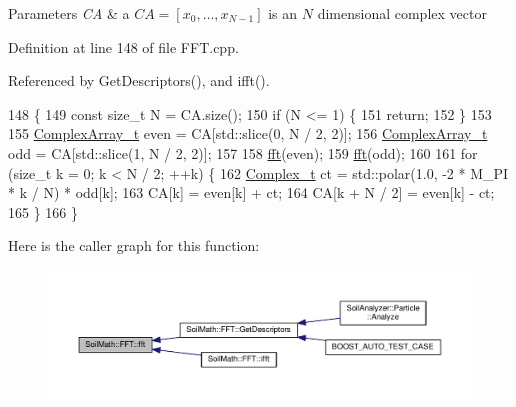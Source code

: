 \begin{DoxyParams}{Parameters}
{\em C\+A} & a $ CA=[x_0,\ldots,x_{N-1}] $ is an $ N $ dimensional complex vector \\
\hline
\end{DoxyParams}


Definition at line 148 of file F\+F\+T.\+cpp.



Referenced by Get\+Descriptors(), and ifft().


\begin{DoxyCode}
148                                 \{
149   \textcolor{keyword}{const} \textcolor{keywordtype}{size\_t} N = CA.size();
150   \textcolor{keywordflow}{if} (N <= 1) \{
151     \textcolor{keywordflow}{return};
152   \}
153 
155   \hyperlink{_soil_math_types_8h_a5118c9f6b02a06945c93a3893e51febe}{ComplexArray\_t} even = CA[std::slice(0, N / 2, 2)];
156   \hyperlink{_soil_math_types_8h_a5118c9f6b02a06945c93a3893e51febe}{ComplexArray\_t} odd = CA[std::slice(1, N / 2, 2)];
157 
158   \hyperlink{class_soil_math_1_1_f_f_t_a48bc7ad948d820d6f87b3e353b6d1cd4}{fft}(even);
159   \hyperlink{class_soil_math_1_1_f_f_t_a48bc7ad948d820d6f87b3e353b6d1cd4}{fft}(odd);
160 
161   \textcolor{keywordflow}{for} (\textcolor{keywordtype}{size\_t} k = 0; k < N / 2; ++k) \{
162     \hyperlink{_soil_math_types_8h_a26c307796ad803485b0376c90026d8f7}{Complex\_t} ct = std::polar(1.0, -2 * M\_PI * k / N) * odd[k];
163     CA[k] = even[k] + ct;
164     CA[k + N / 2] = even[k] - ct;
165   \}
166 \}
\end{DoxyCode}


Here is the caller graph for this function\+:\nopagebreak
\begin{figure}[H]
\begin{center}
\leavevmode
\includegraphics[width=350pt]{class_soil_math_1_1_f_f_t_a48bc7ad948d820d6f87b3e353b6d1cd4_icgraph}
\end{center}
\end{figure}


\hypertarget{class_soil_math_1_1_f_f_t_af5fb6f4804079ee184a314e2f0a0f2fc}{}
